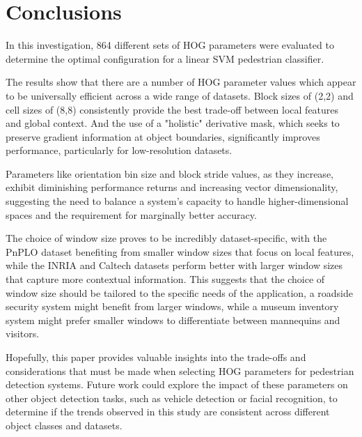 \section{Conclusions}

In this investigation, 864 different sets of HOG parameters were evaluated to determine the optimal configuration for a linear SVM pedestrian classifier.   

The results show that there are a number of HOG parameter values which appear to be universally efficient across a wide range of datasets. Block sizes of (2,2) and cell sizes of (8,8) consistently provide the best trade-off between local features and global context. And the use of a "holistic" derivative mask, which seeks to preserve gradient information at object boundaries, significantly improves performance, particularly for low-resolution datasets.

Parameters like orientation bin size and block stride values, as they increase, exhibit diminishing performance returns and increasing vector dimensionality, suggesting the need to balance a system's capacity to handle higher-dimensional spaces and the requirement for marginally better accuracy.

The choice of window size proves to be incredibly dataset-specific, with the PnPLO dataset benefiting from smaller window sizes that focus on local features, while the INRIA and Caltech datasets perform better with larger window sizes that capture more contextual information. This suggests that the choice of window size should be tailored to the specific needs of the application, a roadside security system might benefit from larger windows, while a museum inventory system might prefer smaller windows to differentiate between mannequins and visitors.

Hopefully, this paper provides valuable insights into the trade-offs and considerations that must be made when selecting HOG parameters for pedestrian detection systems. Future work could explore the impact of these parameters on other object detection tasks, such as vehicle detection or facial recognition, to determine if the trends observed in this study are consistent across different object classes and datasets.

